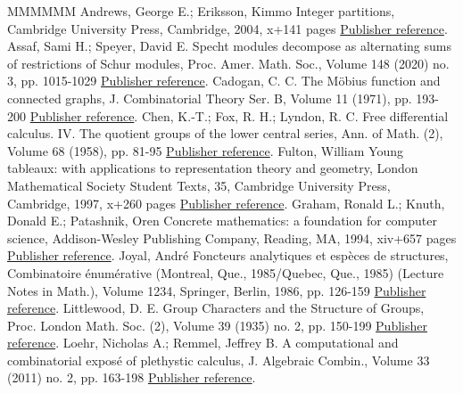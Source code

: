 \documentclass[11pt]{article}
\theoremstyle{definition}
\numberwithin{equation}{section}
\begin{document}
\begin{thebibliography}{MMMMMM}
 Andrews, George E.; Eriksson, Kimmo Integer partitions, Cambridge University Press, Cambridge, 2004, x+141 pages \href{https://alco.centre-mersenne.org/articles/10.5802/alco.365/#MR2122332}{Publisher reference}.
 Assaf, Sami H.; Speyer, David E. Specht modules decompose as alternating sums of restrictions of Schur modules, Proc. Amer. Math. Soc., Volume 148 (2020) no. 3, pp. 1015-1029 \href{https://alco.centre-mersenne.org/articles/10.5802/alco.365/#MR4055931}{Publisher reference}.
 Cadogan, C. C. The Möbius function and connected graphs, J. Combinatorial Theory Ser. B, Volume 11 (1971), pp. 193-200 \href{https://alco.centre-mersenne.org/articles/10.5802/alco.365/#MR0284377}{Publisher reference}.
 Chen, K.-T.; Fox, R. H.; Lyndon, R. C. Free differential calculus. IV. The quotient groups of the lower central series, Ann. of Math. (2), Volume 68 (1958), pp. 81-95 \href{https://alco.centre-mersenne.org/articles/10.5802/alco.365/#MR0102539}{Publisher reference}.
 Fulton, William Young tableaux: with applications to representation theory and geometry, London Mathematical Society Student Texts, 35, Cambridge University Press, Cambridge, 1997, x+260 pages \href{https://alco.centre-mersenne.org/articles/10.5802/alco.365/#MR1464693}{Publisher reference}.
 Graham, Ronald L.; Knuth, Donald E.; Patashnik, Oren Concrete mathematics: a foundation for computer science, Addison-Wesley Publishing Company, Reading, MA, 1994, xiv+657 pages \href{https://alco.centre-mersenne.org/articles/10.5802/alco.365/#MR1397498}{Publisher reference}.
 Joyal, André Foncteurs analytiques et espèces de structures, Combinatoire énumérative (Montreal, Que., 1985/Quebec, Que., 1985) (Lecture Notes in Math.), Volume 1234, Springer, Berlin, 1986, pp. 126-159 \href{https://alco.centre-mersenne.org/articles/10.5802/alco.365/#MR0927763}{Publisher reference}.
 Littlewood, D. E. Group Characters and the Structure of Groups, Proc. London Math. Soc. (2), Volume 39 (1935) no. 2, pp. 150-199 \href{https://alco.centre-mersenne.org/articles/10.5802/alco.365/#MR1576896}{Publisher reference}.
 Loehr, Nicholas A.; Remmel, Jeffrey B. A computational and combinatorial exposé of plethystic calculus, J. Algebraic Combin., Volume 33 (2011) no. 2, pp. 163-198 \href{https://alco.centre-mersenne.org/articles/10.5802/alco.365/#MR2765321}{Publisher reference}.

\end{thebibliography}
\end{document}
